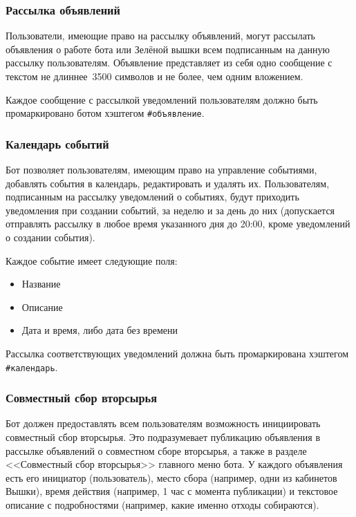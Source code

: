 \subsubsection{Рассылка объявлений}
    \label{sec:req:fn:announce}
    Пользователи, имеющие право на рассылку объявлений, могут
    рассылать объявления о работе бота или Зелёной вышки всем подписанным на данную рассылку
    пользователям. Объявление представляет из себя одно сообщение с текстом не длиннее~3500 символов
    и не более, чем одним вложением.

    Каждое сообщение с рассылкой уведомлений пользователям должно быть промаркировано ботом хэштегом
    \hbox{\texttt{\#объявление}}.

\subsubsection{Календарь событий}
    \label{sec:req:fn:calendar}
    Бот позволяет пользователям, имеющим право на управление событиями, добавлять события в календарь,
    редактировать и удалять их. Пользователям, подписанным на рассылку уведомлений о событиях,
    будут приходить уведомления при создании событий, за неделю и за день до них (допускается отправлять
    рассылку в любое время указанного дня до 20:00, кроме уведомлений о создании события).

    Каждое событие имеет следующие поля:
    \begin{itemize}
        \item
            Название
        \item
            Описание
        \item
            Дата и время, либо дата без времени
    \end{itemize}

    Рассылка соответствующих уведомлений должна быть промаркирована хэштегом \hbox{\texttt{\#календарь}}.

\subsubsection{Совместный сбор вторсырья}
    Бот должен предоставлять всем пользователям возможность инициировать совместный сбор вторсырья.
    Это подразумевает публикацию объявления в рассылке объявлений о совместном сборе вторсырья,
    а также в разделе <<Совместный сбор вторсырья>> главного меню бота. У каждого объявления есть
    его инициатор (пользователь), место сбора (например, одни из кабинетов Вышки), время действия
    (например, 1 час с момента публикации) и текстовое описание с подробностями (например, какие
    именно отходы собираются).

